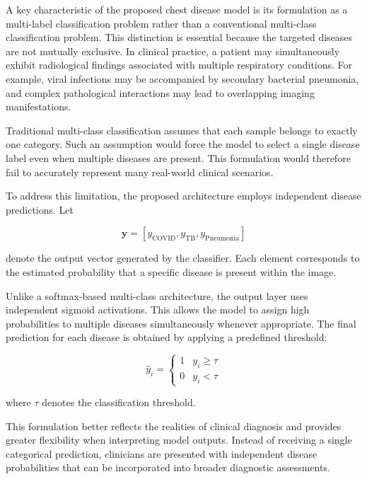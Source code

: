 A key characteristic of the proposed chest disease model is its formulation as a multi-label classification problem rather than a conventional multi-class classification problem. This distinction is essential because the targeted diseases are not mutually exclusive. In clinical practice, a patient may simultaneously exhibit radiological findings associated with multiple respiratory conditions. For example, viral infections may be accompanied by secondary bacterial pneumonia, and complex pathological interactions may lead to overlapping imaging manifestations.

Traditional multi-class classification assumes that each sample belongs to exactly one category. Such an assumption would force the model to select a single disease label even when multiple diseases are present. This formulation would therefore fail to accurately represent many real-world clinical scenarios.

To address this limitation, the proposed architecture employs independent disease predictions. Let

\begin{equation}
	\mathbf{y} =
	[y_{\text{COVID}}, y_{\text{TB}}, y_{\text{Pneumonia}}]
\end{equation}

denote the output vector generated by the classifier. Each element corresponds to the estimated probability that a specific disease is present within the image.

Unlike a softmax-based multi-class architecture, the output layer uses independent sigmoid activations. This allows the model to assign high probabilities to multiple diseases simultaneously whenever appropriate. The final prediction for each disease is obtained by applying a predefined threshold:

\begin{equation}
	\hat{y}_i=
	\begin{cases}
		1 & y_i \geq \tau \\
		0 & y_i < \tau
	\end{cases}
\end{equation}

where $\tau$ denotes the classification threshold.

This formulation better reflects the realities of clinical diagnosis and provides greater flexibility when interpreting model outputs. Instead of receiving a single categorical prediction, clinicians are presented with independent disease probabilities that can be incorporated into broader diagnostic assessments.

